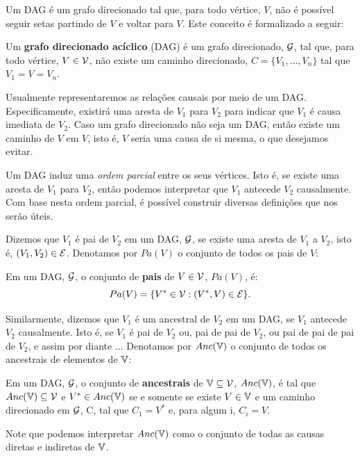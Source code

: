 Um DAG é um grafo direcionado tal que,
para todo vértice, $V$, não é possível
seguir setas partindo de $V$ e
voltar para $V$. Este conceito é
formalizado a seguir:

\begin{definition}
 \label{def:dag}
 Um \textbf{grafo direcionado acíclico} (DAG) é
 um grafo direcionado, ${\mathcal G}$,
 tal que, para todo
 vértice, $V \in {\mathcal V}$, não existe um
 caminho direcionado, $C = \{V_1, \ldots, V_n\}$
 tal que $V_1 = V = V_n$.
\end{definition}

Usualmente representaremos
as relações causais por meio de um DAG.
Especificamente, existirá uma aresta de $V_1$ para $V_2$
para indicar que $V_1$ é causa imediata de $V_2$.
Caso um grafo direcionado não seja um DAG,
então existe um caminho de $V$ em $V$, isto é,
$V$ seria uma causa de si mesma, 
o que desejamos evitar.

Um DAG induz uma \textit{ordem parcial} entre 
os seus vértices. Isto é,
se existe uma aresta de $V_1$ para $V_2$,
então podemos interpretar que
$V_1$ antecede $V_2$ causalmente.
Com base nesta ordem parcial, é
possível construir diversas
definições que nos serão úteis.

Dizemos que $V_1$ é pai de $V_2$ em
um DAG, ${\mathcal G}$, se
existe uma aresta de $V_1$ a $V_2$,
isto é, $(V_1, V_2) \in {\mathcal E}$.
Denotamos por $Pa(V)$ o
conjunto de todos os pais de $V$:

\begin{definition}
 \label{def:pais}
 Em um DAG, ${\mathcal G}$,
 o conjunto de \textbf{pais} de $V \in {\mathcal V}$, $Pa(V)$, é:
 $$Pa(V) = \{V^* \in {\mathcal V}: (V^*, V) \in {\mathcal E}\}.$$
\end{definition}

Similarmente, dizemos que $V_1$ é um ancestral de $V_2$ em
um DAG, se $V_1$ antecede $V_2$ causalmente. Isto é,
se $V_1$ é pai de $V_2$ ou, pai de pai de $V_2$, ou
pai de pai de pai de $V_2$, e assim por diante $\ldots$
Denotamos por $Anc({\mathbb V})$ o conjunto de 
todos os ancestrais de elementos de ${\mathbb V}$:

\begin{definition}
 \label{def:ancestrais}
 Em um DAG, ${\mathcal G}$,
 o conjunto de \textbf{ancestrais} de ${\mathbb V} \subseteq {\mathcal V}$, 
 $Anc({\mathbb V})$, é tal que
 $Anc({\mathbb V}) \subseteq {\mathcal V}$ e
 $V^* \in Anc({\mathbb V})$ se e somente se existe
 $V \in {\mathbb V}$ e
 um caminho direcionado em ${\mathcal G}$, C, tal que
 $C_1 = V^*$ e, para algum i, $C_i = V$.
\end{definition}

Note que podemos interpretar $Anc({\mathbb V})$ como
o conjunto de todas as causas diretas e indiretas de ${\mathbb V}$.

